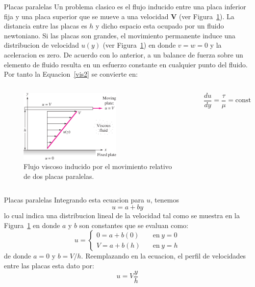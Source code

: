 \documentclass [xcolor=svgnames, t] {beamer}
\begin{document}
\begin{frame}{Placas paralelas}
\vspace{-0.4cm}
Un problema  clasico es el flujo inducido entre una placa inferior fija y una placa superior que se mueve a una velocidad $\mathbf{V}$ (ver Figura~\ref{pla}). La distancia entre las placas es $h$ y dicho espacio esta ocupado por un fluido newtoniano. Si las placas son grandes, el movimiento permanente induce una distribucion de velocidad $u(y)$  (ver Figura~\ref{pla}) en donde $v=w=0$ y la aceleracion es zero. De acuerdo con lo anterior, a un balance de fuerza sobre un elemento de fluido resulta en un esfuerzo constante en cualquier punto del fluido. Por tanto la Equacion~\ref{vis2} se convierte en:

\begin{columns}
\begin{figure}[h]
\centering
\includegraphics[width=5cm]{plate}
\caption{Flujo viscoso inducido por el movimiento relativo de dos placas paralelas.}
\label{pla}
\end{figure}

$$
\frac{du}{dy}=\frac{\tau}{\mu}=\text{const}
$$
\end{columns}
\end{frame}

\begin{frame}{Placas paralelas}
Integrando esta ecuacion para $u$, tenemos
$$
u=a+by
$$
lo cual indica una distribucion lineal de la velocidad tal como se muestra en la Figura~\ref{pla} en donde $a$ y $b$ son constantes que se evaluan como:
$$
u= 
\begin{cases}
0 = a+b(0) & \quad \text{en}\ y=0 \\
V = a+b(h) & \quad \text{en}\ y=h 
\end{cases}
$$
de donde $a=0$ y $b=V/h$. Reemplazando en la ecuacion, el perfil de velocidades entre las placas esta dato por:
\begin{equation}
u=V\frac{y}{h}
\label{upl}
\end{equation}
\end{frame}
\end{document}
